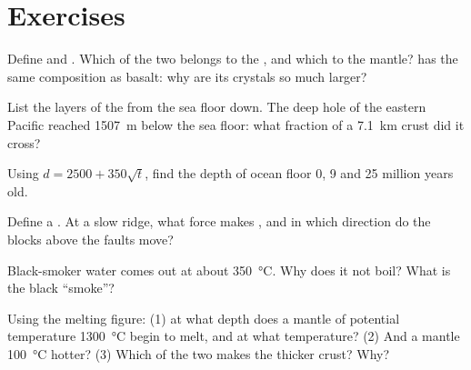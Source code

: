 \section{Exercises}

\begin{exercise}[$\star$]\label{exo:g11:ocean-ridges:1}
Define  and . Which of the two belongs to the ,
and which to the mantle?  has the same composition as basalt: why are
its crystals so much larger?
\end{exercise}

\begin{exercise}[$\star$]\label{exo:g11:ocean-ridges:2}
List the layers of the  from the sea floor down. The deep
hole of the eastern Pacific reached \qty{1507}{m} below the sea floor: what
fraction of a \qty{7.1}{km} crust did it cross?
\end{exercise}

\begin{exercise}[$\star$]\label{exo:g11:ocean-ridges:3}
Using $d = 2500 + 350\sqrt{t}$, find the depth of ocean floor 0, 9 and 25
million years old.
\end{exercise}

\begin{exercise}[$\star$]\label{exo:g11:ocean-ridges:4}
Define a . At a slow ridge, what force makes , and
in which direction do the blocks above the faults move?
\end{exercise}

\begin{exercise}[$\star$]\label{exo:g11:ocean-ridges:5}
Black-smoker water comes out at about \qty{350}{\celsius}. Why does it not
boil? What is the black ``smoke''?
\end{exercise}

\begin{exercise}[$\star\star$]\label{exo:g11:ocean-ridges:6}
Using the melting figure: (1) at what depth does a mantle of potential
temperature \qty{1300}{\celsius} begin to melt, and at what temperature? (2)
And a mantle \qty{100}{\celsius} hotter? (3) Which of the two makes the
thicker crust? Why?
\end{exercise}

